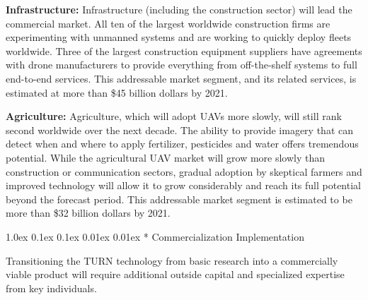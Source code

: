 \documentclass[11pt]{article}
\makeatletter
\renewcommand\subsection{
\@startsection{subsection}{2}{\z@}%
{1.0ex \@plus 0.1ex \@minus 0.1ex}%
{0.01ex \@plus 0.01ex}%
{\normalfont\Large\bfseries}}
\makeatother
\begin{document}
{\color{red} \bf Infrastructure:}
Infrastructure (including the construction sector) will lead the commercial market.  All ten of the largest worldwide construction firms are experimenting with unmanned systems and are working to quickly deploy fleets worldwide.  Three of the largest construction equipment suppliers have agreements with drone manufacturers to provide everything from off-the-shelf systems to full end-to-end services.  This addressable market segment, and its related services, is estimated at more than \$45 billion dollars by 2021.


{\color{red} \bf Agriculture:}
Agriculture, which will adopt UAVs more slowly, will still rank second worldwide over the next decade.  The ability to provide imagery that can detect when and where to apply fertilizer, pesticides and water offers tremendous potential.  While the agricultural UAV market will grow more slowly than construction or communication sectors, gradual adoption by skeptical farmers and improved technology will allow it to grow considerably and reach its full potential beyond the forecast period.  This addressable market segment is estimated to be more than \$32 billion dollars by 2021.




\subsection*{\color{red} Commercialization Implementation}

Transitioning the TURN technology from basic research into a commercially viable product will require additional outside capital and specialized expertise from key individuals.
\end{document}
